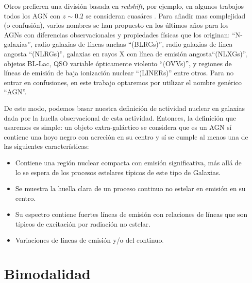 \bigskip

\noindent Otros prefieren una división basada en \textsl{redshift}, por ejemplo, en algunos trabajos todos los AGN con
$z \sim 0.2$ se consideran  cuasáres \citep{vanden2001}. Para añadir mas complejidad (o confusión), varios nombres se han propuesto en los últimos años para los AGNs con diferencias observacionales y propiedades físicas que  los originan: ``N-galaxias'', radio-galaxias de líneas anchas ``(BLRGs)'', radio-galaxias de línea angosta ``(NLRGs)'', galaxias en rayos
X con línea de emisión angosta``(NLXGs)'', objetos BL-Lac, QSO variable ópticamente violento ``(OVVs)'',
y  regiones de líneas de emisión de baja ionización nuclear  ``(LINERs)'' entre otros.
Para no entrar en confusiones, en este trabajo optaremos por utilizar el nombre genérico ``AGN''.

\bigskip

\noindent De este modo, podemos basar nuestra  definición de  actividad nuclear en galaxias
dada  por la huella observacional de esta actividad. Entonces, la definición
que usaremos es simple: un objeto extra-galáctico se considera que es un AGN sí
contiene una hoyo negro con acreción en su centro y sí se cumple al menos una de las siguientes características:

\begin{itemize}

\item Contiene una región nuclear compacta con emisión significativa, más allá de lo
se espera de los procesos estelares típicos de este tipo de Galaxias.

\item Se muestra la huella clara de un proceso continuo no estelar en emisión en
su centro.

\item Su espectro contiene fuertes líneas de emisión con relaciones de líneas que son típicos de
excitación por radiación no estelar.

\item Variaciones de líneas de emisión y/o del continuo.
\end{itemize}




\section{Bimodalidad}

